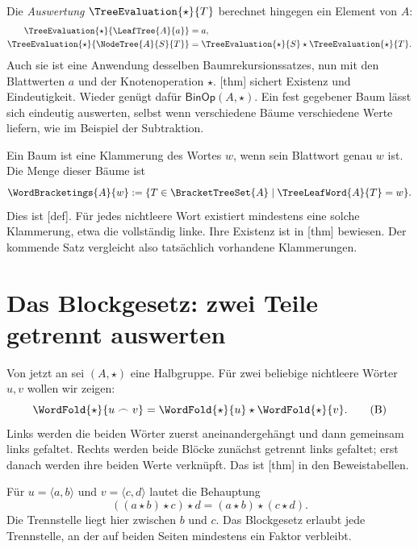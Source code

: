 Die \emph{Auswertung} \(\TreeEvaluation{\star}{T}\) berechnet
hingegen ein Element von \(A\):
\[
  \begin{aligned}
    \TreeEvaluation{\star}{\LeafTree{A}{a}}&=a,\\
    \TreeEvaluation{\star}{\NodeTree{A}{S}{T}}
      &=\TreeEvaluation{\star}{S}\star\TreeEvaluation{\star}{T}.
  \end{aligned}
\]
Auch sie ist eine Anwendung desselben Baumrekursionssatzes, nun mit
den Blattwerten \(a\) und der Knotenoperation \(\star\).
[thm] sichert Existenz
und Eindeutigkeit. Wieder genügt dafür
\(\mathsf{BinOp}(A,\star)\). Ein fest gegebener Baum lässt sich
eindeutig auswerten, selbst wenn verschiedene Bäume verschiedene Werte
liefern, wie im Beispiel der Subtraktion.

Ein Baum ist eine Klammerung des Wortes \(w\), wenn sein Blattwort
genau \(w\) ist. Die Menge dieser Bäume ist
\[
  \WordBracketings{A}{w}
    :=\{T\in\BracketTreeSet{A}\mid\TreeLeafWord{A}{T}=w\}.
\]
Dies ist [def]. Für jedes
nichtleere Wort existiert mindestens eine solche Klammerung, etwa
die vollständig linke. Ihre Existenz ist in
[thm] bewiesen. Der kommende
Satz vergleicht also tatsächlich vorhandene Klammerungen.

\section*{Das Blockgesetz: zwei Teile getrennt auswerten}
\hypertarget{bracketing.reading.block}{}

Von jetzt an sei \((A,\star)\) eine Halbgruppe. Für zwei beliebige
nichtleere Wörter \(u,v\) wollen wir zeigen:
\begin{equation}
  \WordFold{\star}{u\frown v}
    =\WordFold{\star}{u}\star\WordFold{\star}{v}.
  \tag{B}\label{bracketing-reading-block}
\end{equation}
Links werden die beiden Wörter zuerst aneinandergehängt und dann
gemeinsam links gefaltet. Rechts werden beide Blöcke zunächst getrennt
links gefaltet; erst danach werden ihre beiden Werte verknüpft.
Das ist [thm] in den Beweistabellen.

Für \(u=\langle a,b\rangle\) und \(v=\langle c,d\rangle\)
lautet die Behauptung
\[
  ((a\star b)\star c)\star d=(a\star b)\star(c\star d).
\]
Die Trennstelle liegt hier zwischen \(b\) und \(c\). Das
Blockgesetz erlaubt jede Trennstelle, an der auf beiden Seiten
mindestens ein Faktor verbleibt.

